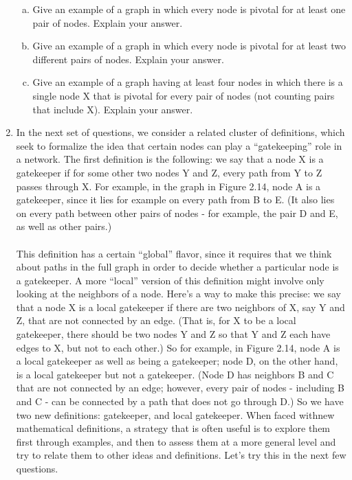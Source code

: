 \documentclass[11pt]{article}
\begin{document}
\begin{enumerate}
	\begin{enumerate}[(a)]
		\item  Give an example of a graph in which every node is pivotal for at least one pair of nodes. Explain your answer.
		\item Give an example of a graph in which every node is pivotal for at least two different pairs of nodes. Explain your answer.
		\item  Give an example of a graph having at least four nodes in which there is a single
node X that is pivotal for every pair of nodes (not counting pairs that include X). Explain your answer.
	\end{enumerate}
\item In the next set of questions, we consider a related cluster of definitions, which seek to formalize the idea that certain nodes can play a “gatekeeping” role in a network. The first definition is the following: we say that a node X is a gatekeeper if for some other two nodes Y and Z, every path from Y to Z passes through X. For example, in the graph in Figure 2.14, node A is a gatekeeper, since it lies for example on every path from B to E. (It also lies on every path between other pairs of nodes - for example, the pair D and E, as well as other pairs.)\\\\
\quad This definition has a certain “global” flavor, since it requires that we think about paths in the full graph in order to decide whether a particular node is a gatekeeper. A more “local” version of this definition might involve only looking at the neighbors of a node. Here’s a way to make this precise: we say that a node X is a local gatekeeper if there are two neighbors of X, say Y and Z, that are not connected by an edge. (That is, for X to be a local gatekeeper, there should be two nodes Y and Z so that Y and Z each have edges to X, but not to each other.) So for example, in Figure 2.14, node A is a local gatekeeper as well as being a gatekeeper; node D, on the other hand, is a local gatekeeper but not a gatekeeper. (Node D has neighbors B and C that are not connected by an edge; however, every pair of nodes - including B and C - can be connected by a path that does not go through D.) So we have two new definitions: gatekeeper, and local gatekeeper. When faced withnew mathematical definitions, a strategy that is often useful is to explore them first through examples, and then to assess them at a more general level and try to relate them to other ideas and definitions. Let’s try this in the next few questions.\\

\end{enumerate}
\end{document}
